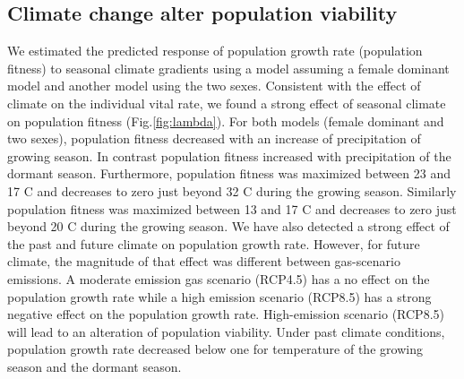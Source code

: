 \documentclass[12pt]{article}
\begin{document}
\subsection*{Climate change alter population viability}
We estimated the predicted response of  population growth rate (population fitness) to seasonal climate gradients using a model assuming a female dominant model and another model using the two sexes. 
Consistent with the effect of climate on the individual vital rate, we found a strong effect of seasonal climate on population fitness (Fig.\ref{fig:lambda}). 
For both models (female dominant and two sexes), population fitness decreased with an increase of precipitation of growing season. 
In contrast population fitness increased with precipitation of the dormant season.
Furthermore, population fitness was maximized between 23 and 17 \degree C and decreases to zero just beyond 32 \degree C during the growing season.
Similarly population fitness was maximized between 13 and 17 \degree C and decreases to zero just beyond 20 \degree C during the growing season.
We have also detected a strong effect of the past and future climate on population growth rate. However, for future climate, the magnitude of that effect was different between gas-scenario emissions. 
A moderate emission gas scenario (RCP4.5) has a no effect on the population growth rate while a high emission scenario (RCP8.5) has a strong negative effect on the population growth rate. 
High-emission scenario (RCP8.5) will lead to an alteration of population viability. 
Under past climate conditions, population growth rate decreased below one for temperature of the growing season and the dormant season.
\end{document}
